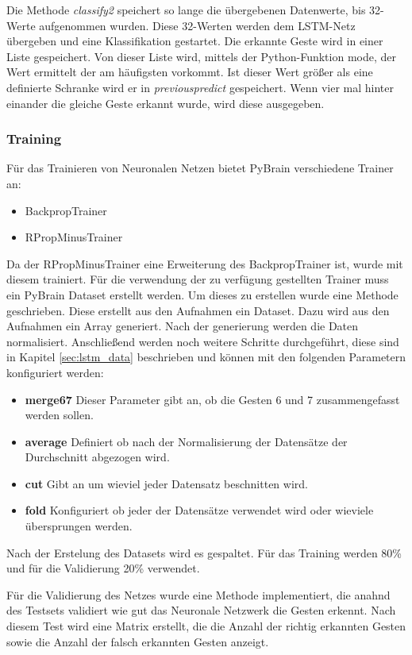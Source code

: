 Die Methode \textit{classify2} speichert so lange die übergebenen Datenwerte, 
bis 32-Werte aufgenommen wurden. Diese 32-Werten werden dem \ac{LSTM}-Netz 
übergeben und eine Klassifikation gestartet. Die erkannte Geste wird in einer 
Liste gespeichert. Von dieser Liste wird, mittels der Python-Funktion mode, 
der Wert ermittelt der am häufigsten vorkommt. Ist dieser Wert größer als eine 
definierte Schranke wird er in \textit{previouspredict} gespeichert. Wenn vier 
mal hinter einander die gleiche Geste erkannt wurde, wird diese ausgegeben.

\subsubsection{Training}
Für das Trainieren von Neuronalen Netzen bietet PyBrain verschiedene 
Trainer an:
\begin{itemize}
\item BackpropTrainer
\item RPropMinusTrainer
\end{itemize}
Da der RPropMinusTrainer eine Erweiterung des BackpropTrainer ist, wurde mit 
diesem trainiert. Für die verwendung der zu verfügung gestellten Trainer 
muss ein PyBrain Dataset erstellt werden. Um dieses zu erstellen wurde eine 
Methode geschrieben. Diese erstellt aus den Aufnahmen ein Dataset. Dazu wird 
aus den Aufnahmen ein Array generiert. Nach der generierung werden die Daten 
normalisiert. Anschließend werden noch weitere Schritte durchgeführt, diese 
sind in Kapitel \autoref{sec:lstm_data} beschrieben und können mit den folgenden 
Parametern konfiguriert werden:
\begin{itemize}
\item \textbf{merge67} Dieser Parameter gibt an, ob die Gesten 6 und 7 
zusammengefasst werden sollen.
\item \textbf{average} Definiert ob nach der Normalisierung der Datensätze der 
Durchschnitt abgezogen wird. 
\item \textbf{cut} Gibt an um wieviel jeder Datensatz beschnitten wird.
\item \textbf{fold} Konfiguriert ob jeder der Datensätze verwendet wird oder
wieviele übersprungen werden.
\end{itemize} 
Nach der Erstelung des Datasets wird es gespaltet. Für das Training werden 
80\% und für die Validierung 20\% verwendet.

Für die Validierung des Netzes wurde eine Methode implementiert, die anahnd 
des Testsets validiert wie gut das Neuronale Netzwerk die Gesten erkennt. Nach 
diesem Test wird eine Matrix erstellt, die die Anzahl der richtig erkannten Gesten 
sowie die Anzahl der falsch erkannten Gesten anzeigt. 

